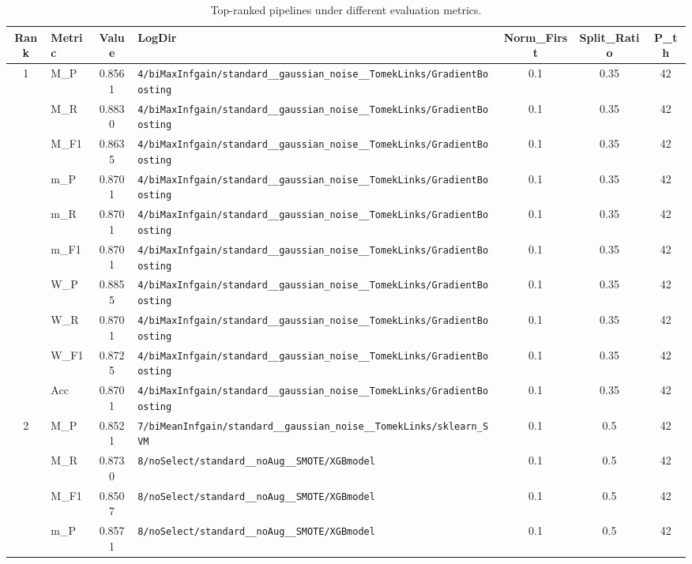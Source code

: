 \begin{table}[htbp]
\caption{Top-ranked pipelines under different evaluation metrics.}
\label{tab:rank_metric_vertical}
\centering
\small
\setlength{\tabcolsep}{4pt}
\begin{tabular}{|c|l|c|>{\ttfamily\footnotesize}p{7.2cm}|c|c|c|}
\hline
Rank & Metric & Value & LogDir & Norm\_First & Split\_Ratio & P\_th \\
\hline
\multirow{10}{*}{1} & M\_P & 0.8561 & \texttt{4/biMaxInfgain/standard\_\_gaussian\_noise\_\_TomekLinks/GradientBoosting} & 0.1 & 0.35  & 42 \\ 
 & M\_R & 0.8830 & \texttt{4/biMaxInfgain/standard\_\_gaussian\_noise\_\_TomekLinks/GradientBoosting} & 0.1 & 0.35  & 42 \\ 
 & M\_F1 & 0.8635 & \texttt{4/biMaxInfgain/standard\_\_gaussian\_noise\_\_TomekLinks/GradientBoosting} & 0.1 & 0.35  & 42 \\ 
 & m\_P & 0.8701 & \texttt{4/biMaxInfgain/standard\_\_gaussian\_noise\_\_TomekLinks/GradientBoosting} & 0.1 & 0.35  & 42 \\ 
 & m\_R & 0.8701 & \texttt{4/biMaxInfgain/standard\_\_gaussian\_noise\_\_TomekLinks/GradientBoosting} & 0.1 & 0.35  & 42 \\ 
 & m\_F1 & 0.8701 & \texttt{4/biMaxInfgain/standard\_\_gaussian\_noise\_\_TomekLinks/GradientBoosting} & 0.1 & 0.35  & 42 \\ 
 & W\_P & 0.8855 & \texttt{4/biMaxInfgain/standard\_\_gaussian\_noise\_\_TomekLinks/GradientBoosting} & 0.1 & 0.35  & 42 \\ 
 & W\_R & 0.8701 & \texttt{4/biMaxInfgain/standard\_\_gaussian\_noise\_\_TomekLinks/GradientBoosting} & 0.1 & 0.35  & 42 \\ 
 & W\_F1 & 0.8725 & \texttt{4/biMaxInfgain/standard\_\_gaussian\_noise\_\_TomekLinks/GradientBoosting} & 0.1 & 0.35  & 42 \\ 
 & Acc & 0.8701 & \texttt{4/biMaxInfgain/standard\_\_gaussian\_noise\_\_TomekLinks/GradientBoosting} & 0.1 & 0.35  & 42 \\ 
\hline
\multirow{10}{*}{2} & M\_P & 0.8521 & \texttt{7/biMeanInfgain/standard\_\_gaussian\_noise\_\_TomekLinks/sklearn\_SVM} & 0.1 & 0.5  & 42 \\ 
 & M\_R & 0.8730 & \texttt{8/noSelect/standard\_\_noAug\_\_SMOTE/XGBmodel} & 0.1 & 0.5  & 42 \\ 
 & M\_F1 & 0.8507 & \texttt{8/noSelect/standard\_\_noAug\_\_SMOTE/XGBmodel} & 0.1 & 0.5  & 42 \\ 
 & m\_P & 0.8571 & \texttt{8/noSelect/standard\_\_noAug\_\_SMOTE/XGBmodel} & 0.1 & 0.5  & 42 \\ 

\end{tabular}
\end{table}

